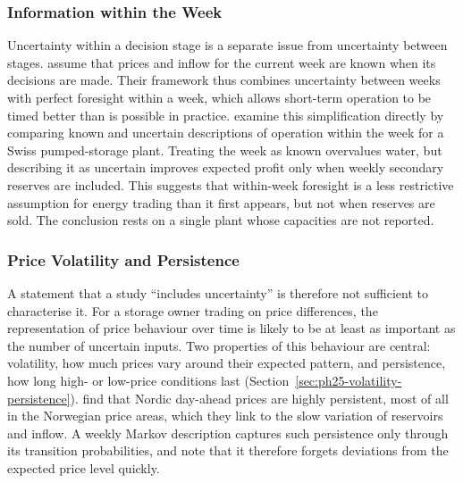 \subsubsection{Information within the Week}

Uncertainty within a decision stage is a separate issue from uncertainty
between stages. \citet{bore2026assessing} assume that prices and inflow
for the current week are known when its decisions are made. Their
framework thus combines uncertainty between weeks with perfect foresight
within a week, which allows short-term operation to be timed better than
is possible in practice. \citet{abgottspon2014} examine this
simplification directly by comparing known and uncertain descriptions of
operation within the week for a Swiss pumped-storage plant. Treating the
week as known overvalues water, but describing it as uncertain improves
expected profit only when weekly secondary reserves are included. This
suggests that within-week foresight is a less restrictive assumption for
energy trading than it first appears, but not when reserves are sold.
The conclusion rests on a single plant whose capacities are not
reported.

\subsubsection{Price Volatility and Persistence}

A statement that a study ``includes uncertainty'' is therefore not
sufficient to characterise it. For a storage owner trading on price
differences, the representation of price behaviour over time is likely
to be at least as important as the number of uncertain inputs. Two
properties of this behaviour are central: volatility, how much prices
vary around their expected pattern, and persistence, how long high- or
low-price conditions last (Section~\ref{sec:ph25-volatility-persistence}).
\citet{haldrup2006regime} find that Nordic day-ahead prices are highly
persistent, most of all in the Norwegian price areas, which they link to
the slow variation of reservoirs and inflow. A weekly Markov description
captures such persistence only through its transition probabilities, and
\citet{mo2001} note that it therefore forgets deviations from the
expected price level quickly.

